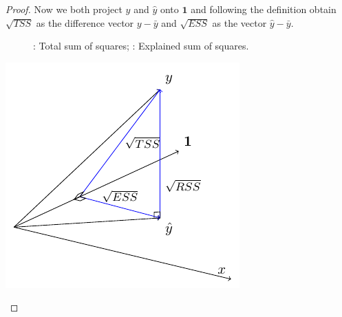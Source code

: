 \begin{proof}
Now we both project $y$ and $\hat y$ onto $\mathbf{1}$ and following the definition obtain $\sqrt{TSS}$ as the difference vector $y - \bar y$ and $\sqrt{ESS}$ as the vector $\hat y - \bar y$.

\begin{figure}[h!]
\begin{center}
\hspace{4ex}
\caption{: Total sum of squares; : Explained sum of squares.}
\end{center}
\end{figure}

\begin{marginfigure}
\includegraphics[scale=0.7]{figures/02_rss_ess_tss_final.pdf}
\caption{$(\sqrt{RSS})^2 + (\sqrt{ESS})^2 = (\sqrt{TSS})^2$}
\label{fig:tss_final}
\end{marginfigure}


\end{proof}
